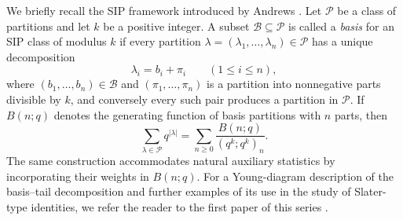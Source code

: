 \documentclass[11pt]{amsart}
\theoremstyle{definition}
\theoremstyle{remark}
\numberwithin{equation}{section}
\begin{document}
We briefly recall the SIP framework introduced by Andrews \cite{AndrewsSIP}. Let $\mathcal P$ be a class of partitions and let $k$ be a positive integer. A subset $\mathcal B\subseteq\mathcal P$ is called a \emph{basis} for an SIP class of modulus $k$ if every partition $\lambda=(\lambda_1,\ldots,\lambda_n)\in\mathcal P$ has a unique decomposition
\[
\lambda_i=b_i+\pi_i \qquad (1\le i\le n),
\]
where $(b_1,\ldots,b_n)\in\mathcal B$ and $(\pi_1,\ldots,\pi_n)$ is a partition into nonnegative parts divisible by $k$, and conversely every such pair produces a partition in $\mathcal P$. If $B(n;q)$ denotes the generating function of basis partitions with $n$ parts, then
\begin{equation}\label{eq:sip-general-gf}
\sum_{\lambda\in\mathcal P}q^{|\lambda|}
=\sum_{n\ge0}\frac{B(n;q)}{(q^k;q^k)_n}.
\end{equation}
The same construction accommodates natural auxiliary statistics by incorporating their weights in $B(n;q)$. For a Young-diagram description of the basis--tail decomposition and further examples of its use in the study of Slater-type identities, we refer the reader to the first paper of this series \cite{DGLSIPI}.
\end{document}
